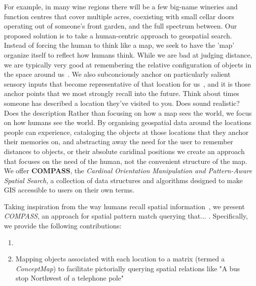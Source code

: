 For example, in many wine regions there will be a few big-name wineries and function centres that cover multiple acres, coexisting with small cellar doors operating out of someone's front garden, and the full spectrum between. 
Our proposed solution is to take a human-centric approach to geospatial search.
Instead of forcing the human to think like a map, we seek to have the 'map' organize itself to reflect how humans think. 
While we are bad at judging distance, we are typically very good at remembering the relative configuration of objects in the space around us~\cite{Schwering2014}.
We also subconciously anchor on particularly salient sensory inputs that become representative of that location for us~\cite{Weisberg2016, Miller2013, Keatley2021}, and it is those anchor points that we most strongly recall into the future. 
Think about times someone has described a location they've visited to you.
Does  sound realistic?
Does the description 
Rather than focusing on how a map sees the world, we focus on how humans see the world.
By organising geospatial data around the locations people can experience, cataloging the objects at those locations that they anchor their memories on, and abstracting away the need for the user to remember distances to objects, or their absolute caridinal positions we create an approach that focuses on the need of the human, not the convenient structure of the map. 
We offer \textbf{COMPASS}, the \textit{Cardinal Orientation Manipulation and Pattern-Aware Spatial Search}, a collection of data structures and algorithms designed to make GIS accessible to users on their own terms.





Taking inspiration from the way humans recall spatial information~\cite{Helbing2020, Oliveira2016, Weisberg2016},  we present \emph{COMPASS}, an approach for spatial pattern match querying that... . Specifically, we provide the following contributions:
\begin{enumerate}
    \item {}
    \item Mapping objects associated with each location to a matrix (termed a \emph{ConceptMap}) to facilitate pictorially querying spatial relations like "A bus stop Northwest of a telephone pole"
\end{enumerate}

